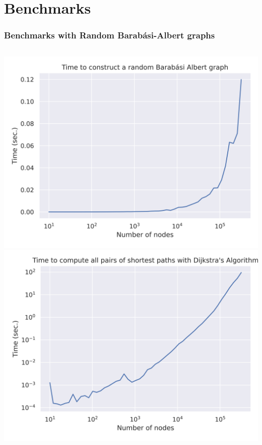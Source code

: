 \documentclass[aspectratio=169,11pt,hyperref={colorlinks=true}]{beamer}
\begin{document}
\section{Benchmarks}
\begin{frame}
    \frametitle{Benchmarks with Random Barabási-Albert graphs\footnotemark}
    \begin{columns}
            \includegraphics[width=\textwidth]{albert-graph_time.png} \\
            \includegraphics[height=.45\textheight]{shortest_path.png} \\

\end{columns}
\end{frame}
\end{document}
